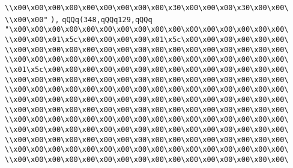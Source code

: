 \verb|\\x00\x00\x00\x00\x00\x00\x00\x00\x00\x30\x00\x00\x00\x30\x00\x00\|\newline
\verb|\\x00\x00"|\newline
\verb|),|\newline
\verb|qQQq(348,qQQq129,qQQq|\newline
\verb|"\x00\x00\x00\x00\x00\x00\x00\x00\x00\x00\x00\x00\x00\x00\x00\x00\|\newline
\verb|\\x00\x00\x01\x5c\x00\x00\x00\x00\x01\x5c\x00\x00\x00\x00\x00\x00\|\newline
\verb|\\x00\x00\x00\x00\x00\x00\x00\x00\x00\x00\x00\x00\x00\x00\x00\x00\|\newline
\verb|\\x00\x00\x00\x00\x00\x00\x00\x00\x00\x00\x00\x00\x00\x00\x00\x00\|\newline
\verb|\\x01\x5c\x00\x00\x00\x00\x00\x00\x00\x00\x00\x00\x00\x00\x00\x00\|\newline
\verb|\\x00\x00\x00\x00\x00\x00\x00\x00\x00\x00\x00\x00\x00\x00\x00\x00\|\newline
\verb|\\x00\x00\x00\x00\x00\x00\x00\x00\x00\x00\x00\x00\x00\x00\x00\x00\|\newline
\verb|\\x00\x00\x00\x00\x00\x00\x00\x00\x00\x00\x00\x00\x00\x00\x00\x00\|\newline
\verb|\\x00\x00\x00\x00\x00\x00\x00\x00\x00\x00\x00\x00\x00\x00\x00\x00\|\newline
\verb|\\x00\x00\x00\x00\x00\x00\x00\x00\x00\x00\x00\x00\x00\x00\x00\x00\|\newline
\verb|\\x00\x00\x00\x00\x00\x00\x00\x00\x00\x00\x00\x00\x00\x00\x00\x00\|\newline
\verb|\\x00\x00\x00\x00\x00\x00\x00\x00\x00\x00\x00\x00\x00\x00\x00\x00\|\newline
\verb|\\x00\x00\x00\x00\x00\x00\x00\x00\x00\x00\x00\x00\x00\x00\x00\x00\|\newline
\verb|\\x00\x00\x00\x00\x00\x00\x00\x00\x00\x00\x00\x00\x00\x00\x00\x00\|\newline

